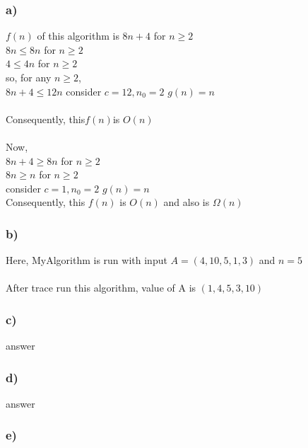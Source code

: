 \documentclass[10pt, a4paper]{article}
\begin{document}
	\subsubsection*{a)}
	{$f(n)$ of this algorithm is $8n+4$ for $n \geq 2$ \\}
	{$ 8n \leq 8n$ for $ n \geq 2 $ \\}
	{$ 4 \leq 4n$ for $ n \geq 2 $ \\}
	{so, for any $n \geq 2$,\\}
	{$8n+4 \leq 12n $ \rightarrow consider \hspace{.1cm} $c=12, n_0=2$ \rightarrow $ g(n) = n$ \\ \\}
	{Consequently, this\hspace{.1cm}$f(n)$\hspace{.1cm}is\hspace{.1cm} $O(n)$}
	\\\\
	{Now,\\}
	{$8n+4 \geq 8n $ for $ n \geq 2$}\\
	{$8n \geq n $ for $ n \geq 2$}\\
	{\rightarrow consider $ c = 1, n_0 = 2 $ \rightarrow $ g(n) = n$}\\
	{Consequently, this $ f(n) $ is $ O(n) $ and \hspace{.1cm} also \hspace{.1cm} is $ \Omega(n)$}
	
	\subsubsection*{b)}
	{Here, MyAlgorithm is run with input $ A = (4,10,5,1,3) $ and $ n = 5$ \\ \\}
	{After trace run this algorithm, value of A is $ (1,4,5,3,10) $ }
	\subsubsection*{c)}
	answer
	\subsubsection*{d)}
	answer
	\subsubsection*{e)}
	{}

		
\end{document}
